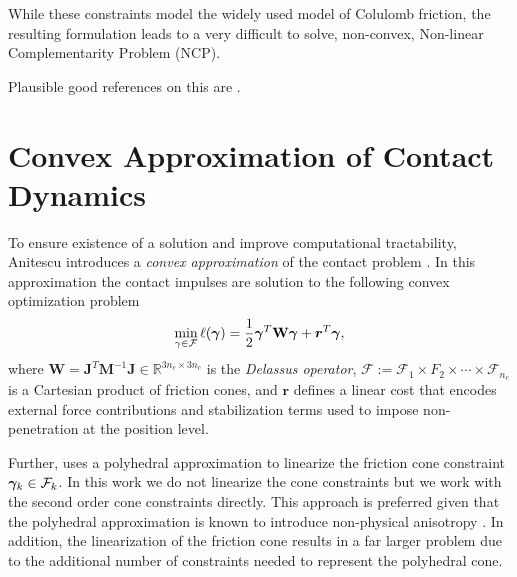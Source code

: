 While these constraints model the widely used model of Colulomb friction, the
resulting formulation leads to a very difficult to solve, non-convex, Non-linear
Complementarity Problem (NCP). 



Plausible good references on this are
\cite{bib:stewart1996implicit,bib:stewart2000implicit,bib:chakraborty2007implicit,bib:acary2018solving,bib:pang1999unified,bib:alart2018inconsistency}.

\section{Convex Approximation of Contact Dynamics}
\label{sec:previous_work}

To ensure existence of a solution and improve computational tractability,
Anitescu introduces a \textit{convex approximation} of the contact
problem \cite{bib:anitescu2006}. In this approximation the contact impulses are
solution to the following convex optimization problem
\begin{eqnarray}
	\min_{\gamma\in \mathcal{F}} \ell(\bgamma) =
	\frac{1}{2}\bgamma^T\mathbf{W}\bgamma + {\bm r}^T
	\bgamma,
	\label{eq:dual_cost}
\end{eqnarray}
where $\mathbf{W} =
\mathbf{J}^T\mathbf{M}^{-1}\mathbf{J}\in\mathbb{R}^{3n_c\times 3n_c}$ is the
\emph{Delassus operator}, $\mathcal{F} := \mathcal{F}_1 \times F_2 \times \cdots
\times \mathcal{F}_{n_c}$ is a Cartesian product of friction cones, and ${\bm
r}$ defines a linear cost  that encodes external force contributions and
stabilization terms used to impose non-penetration at the position level.

Further, \cite{bib:anitescu2006} uses a polyhedral approximation to linearize
the friction cone constraint ${\bm\gamma}_k\in\mathcal{F}_k$. In this work we do not
linearize the cone constraints but we work with the second order cone
constraints directly. This approach is preferred given that the polyhedral
approximation is known to introduce non-physical anisotropy
\cite{bib:li2018implicit}. In addition, the linearization of the friction cone
results in a far larger problem due to the additional number of constraints
needed to represent the polyhedral cone.

